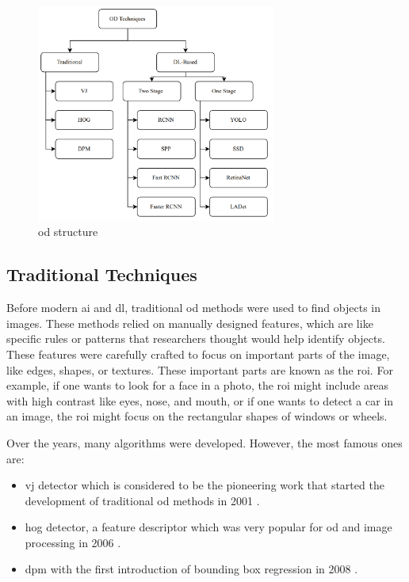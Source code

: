 \begin{figure}[!ht]
    \centering
    \includegraphics[width=0.7\textwidth]{Figures/OD_Mindmape.PNG} 
    \caption{\gls{od} structure \cite{oD_Review}}
    \label{OD_Mindmap}
\end{figure}

\subsection{Traditional Techniques}
Before modern \gls{ai} and \gls{dl}, traditional \gls{od} methods were used to find objects in images. These methods relied on manually designed features, which are like specific rules or patterns that researchers thought would help identify objects. These features were carefully crafted to focus on important parts of the image, like edges, shapes, or textures. These important parts are known as the \gls{roi}. For example, if one wants to look for a face in a photo, the \gls{roi} might include areas with high contrast like eyes, nose, and mouth, or if one wants to detect a car in an image, the \gls{roi} might focus on the rectangular shapes of windows or wheels.

Over the years, many algorithms were developed. However, the most famous ones are:
\begin{itemize}
    \item \gls{vj} detector which is considered to be the pioneering work that started the development of traditional \gls{od} methods in 2001 \cite{Fam_Traditional_detectors}.
    \item \gls{hog} detector, a feature descriptor which was very popular for \gls{od} and image processing in 2006 \cite{Fam_Traditional_detectors}.
    \item \gls{dpm} with the first introduction of bounding box regression in 2008 \cite{Fam_Traditional_detectors}.
\end{itemize}

